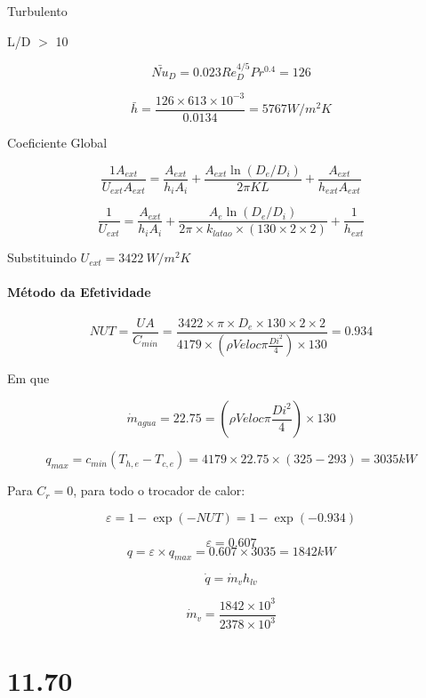 Turbulento

L/D $>$ 10

\[\bar{Nu}_{D} = 0.023 Re_{D}^{4/5}Pr^{0.4}=126\]

\[\bar{h}=\frac{126 \times 613 \times 10^{-3}}{ 0.0134 } = 5767 W/m^{2}K\]

Coeficiente Global

\[\frac{1 A_{ext}}{U_{ext}A_{ext}}=\frac{A_{ext}}{h_{i}A_{i}}+\frac{A_{ext}\ln(D_{e}/D_{i})}{2 \pi KL}+\frac{A_{ext}}{h_{ext}A_{ext}}
\]

\[\frac{1}{U_{ext}}=\frac{A_{ext}}{h_{i}A_{i}}+\frac{A_{e}\ln(D_{e}/D_{i})}{2 \pi \times k_{latao} \times (130\times 2 \times 2)} + \frac{1}{h_{ext}}\]

Substituindo $U_{ext} = 3422 \ W/m^{2}K$  
\paragraph{Método da Efetividade}


\[NUT = \frac{UA}{C_{min}} = \frac{3422 \times \pi \times D_{e} \times 130 \times 2 \times 2}{4179 \times (\rho Veloc \pi \frac{Di^{2}}{4}) \times 130 } = 0.934\]



Em que 

\[\dot{m}_{agua} = 22.75 = (\rho Veloc \pi \frac{Di^{2}}{4}) \times 130\]

\[q_{max}= c_{min}(T_{h,e}-T_{c,e}) = 4179 \times 22.75 \times (325-293) = 3035 kW\]

Para $C_{r} = 0$, para todo o trocador de calor:

\[\varepsilon = 1 - \exp(-NUT)=1-\exp(-0.934)\] 

\[\varepsilon = 0.607\]
\[q = \varepsilon \times q_{max} = 0.607 \times 3035 = 1842 kW\]

\[\dot{q}=\dot{m}_{v}h_{lv}\]

\[\dot{m}_{v}=\frac{1842 \times 10^{3}}{2378 \times 10^{3}}\]

\section{11.70}



